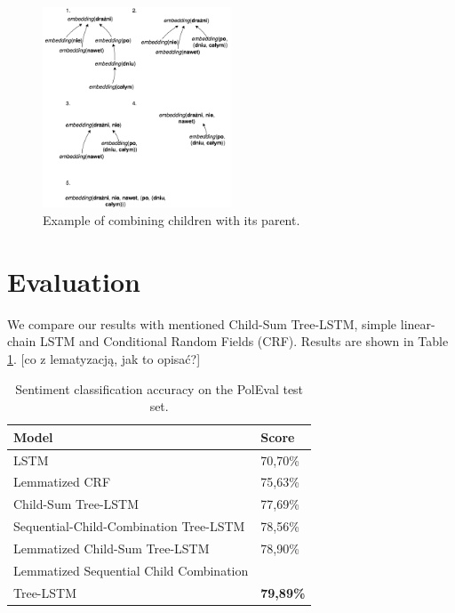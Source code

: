 \documentclass[10pt, a4paper]{article}
\begin{document}
\begin{figure}[h]
	\begin{center}
		\includegraphics[width=0.5\textwidth]{imgs/niedrazniex}
		\caption{Example of combining children with its parent.}
		\label{tab:niedrazniex}
	\end{center}
\end{figure}
	
\section{Evaluation} 
	We compare our results with mentioned Child-Sum Tree-LSTM, simple linear-chain LSTM and Conditional Random Fields (CRF).  Results are shown in Table \ref{tab:evaluation}.
	[co z lematyzacją, jak to opisać?]
\begin{table}[h]
 \begin{center}
\begin{tabular}{|l|l|}

      \hline
      Model & Score\\
      \hline
      LSTM &70,70\%\\
      \hline
      Lemmatized CRF & 75,63\%\\
      \hline
      Child-Sum Tree-LSTM &  77,69\%\\
      \hline
      Sequential-Child-Combination Tree-LSTM & 78,56\%\\
      \hline
      Lemmatized Child-Sum Tree-LSTM & 78,90\%\\
      \hline
      Lemmatized Sequential Child Combination & \\
      Tree-LSTM & \textbf{79,89\%} \\
      \hline
\end{tabular}
\caption{Sentiment classification accuracy on the PolEval test set.}
\label{tab:evaluation}
 \end{center}
\end{table}
\end{document}
